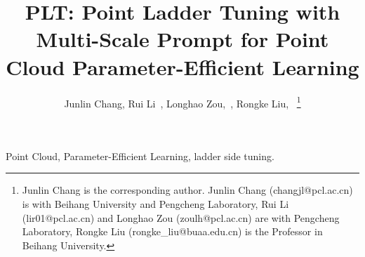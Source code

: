 \documentclass[lettersize,journal]{IEEEtran}
\begin{document}
\title{PLT: Point Ladder Tuning with Multi-Scale Prompt for Point Cloud
Parameter-Efficient Learning}

\author{Junlin Chang, Rui Li~, Longhao Zou,~, Rongke Liu,~
\thanks{Junlin Chang is the corresponding author. Junlin Chang (changjl@pcl.ac.cn) is with Beihang University and Pengcheng Laboratory, Rui Li (lir01@pcl.ac.cn) and Longhao Zou (zoulh@pcl.ac.cn) are with Pengcheng Laboratory, Rongke Liu (rongke\_liu@buaa.edu.cn) is the Professor in Beihang University.}}%



\maketitle



\begin{IEEEkeywords}
Point Cloud, Parameter-Efficient Learning, ladder side tuning.
\end{IEEEkeywords}











\end{document}
